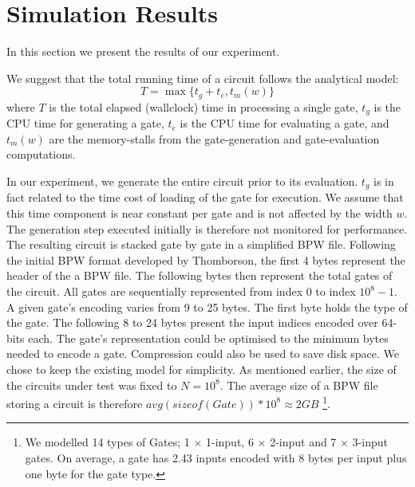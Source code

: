\section{Simulation Results}
In this section we present the results of our experiment.
\par
We suggest that the total running time of a circuit follows the analytical model:
\begin{equation}
T = \max\{ t_g + t_e, t_m(w) \}
\end{equation}
where $T$ is the total elapsed (wallclock) time in processing a single gate, $t_g$ is the CPU time for generating a gate, $t_e$ is the CPU time for evaluating a gate, and $t_m(w)$ are the memory-stalls from the gate-generation and gate-evaluation computations.
\par
In our experiment, we generate the entire circuit prior to its evaluation. $t_g$ is in fact related to the time cost of loading of the gate for execution. We assume that this time component is near constant per gate and is not affected by the width $w$. The generation step executed initially is therefore not monitored for performance. The resulting circuit is stacked gate by gate in a simplified BPW file. Following the initial BPW format developed by Thomborson, the first 4 bytes represent the header of the a BPW file\cite{clark}. The following bytes then represent the total gates of the circuit. All gates are sequentially represented from index $0$ to index $10^8-1$. A given gate's encoding varies from 9 to 25 bytes. The first byte holds the type of the gate. The following 8 to 24 bytes present the input indices encoded over 64-bits each. The gate's representation could be optimised to the minimum bytes needed to encode a gate. Compression could also be used to save disk space. We chose to keep the existing model for simplicity. As mentioned earlier, the size of the circuits under test was fixed to $N = 10^8$. The average size of a BPW file storing a circuit is therefore $avg(sizeof(Gate)) * 10^8 \approx 2 GB$ \footnote{We modelled 14 types of Gates; 1 $\times$ 1-input, 6 $\times$ 2-input and 7 $\times$ 3-input gates. On average, a gate has 2.43 inputs encoded with 8 bytes per input plus one byte for the gate type.}.


